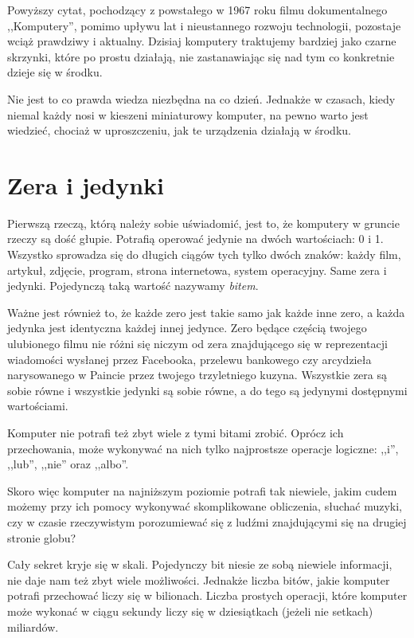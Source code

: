 \documentclass[11pt]{book}
\begin{document}
Powyższy cytat, pochodzący z powstałego w 1967 roku filmu dokumentalnego
,,Komputery'', pomimo upływu lat i nieustannego rozwoju technologii, pozostaje
wciąż prawdziwy i aktualny. Dzisiaj komputery traktujemy bardziej jako
czarne skrzynki, które po prostu działają, nie zastanawiając się nad tym
co konkretnie dzieje się w środku.

Nie jest to co prawda wiedza niezbędna na co dzień. Jednakże w czasach, kiedy
niemal każdy nosi w kieszeni miniaturowy komputer, na pewno warto jest wiedzieć,
chociaż w uproszczeniu, jak te urządzenia działają w środku.

\section{Zera i jedynki}
Pierwszą rzeczą, którą należy sobie uświadomić, jest to, że komputery w gruncie
rzeczy są dość głupie. Potrafią operować jedynie na dwóch wartościach: 0 i 1.
Wszystko sprowadza się do długich ciągów tych tylko dwóch znaków: każdy film,
artykuł, zdjęcie, program, strona internetowa, system operacyjny. Same zera
i jedynki. Pojedynczą taką wartość nazywamy \textit{bitem}.

Ważne jest również to, że każde zero jest takie samo jak każde inne zero, a
każda jedynka jest identyczna każdej innej jedynce. Zero będące częścią twojego
ulubionego filmu nie różni się niczym od zera znajdującego się w reprezentacji
wiadomości wysłanej przez Facebooka, przelewu bankowego czy arcydzieła
narysowanego w Paincie przez twojego trzyletniego kuzyna. Wszystkie zera są
sobie równe i wszystkie jedynki są sobie równe, a do tego są jedynymi
dostępnymi wartościami.

Komputer nie potrafi też zbyt wiele z tymi bitami zrobić. Oprócz ich
przechowania, może wykonywać na nich tylko najprostsze operacje logiczne:
,,i'', ,,lub'', ,,nie'' oraz ,,albo''.

Skoro więc komputer na najniższym poziomie potrafi tak niewiele, jakim cudem
możemy przy ich pomocy wykonywać skomplikowane obliczenia, słuchać muzyki,
czy w czasie rzeczywistym porozumiewać się z ludźmi znajdującymi się na
drugiej stronie globu?

Cały sekret kryje się w skali. Pojedynczy bit niesie ze sobą niewiele
informacji, nie daje nam też zbyt wiele możliwości. Jednakże liczba bitów,
jakie komputer potrafi przechować liczy się w bilionach. Liczba prostych
operacji, które komputer może wykonać w ciągu sekundy liczy się w dziesiątkach
(jeżeli nie setkach) miliardów.
\end{document}
